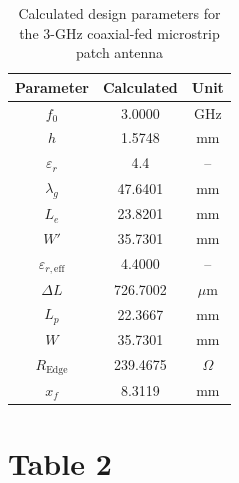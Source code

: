 \documentclass[compress,aspectratio=169,10pt]{beamer}
\begin{document}
\begin{frame}
    \begin{table}[!ht]
        \centering
        \footnotesize
        \begin{tabular}{|c|c|c|}
            \hline
            \textbf{Parameter} & \textbf{Calculated} & \textbf{Unit} \\
            \hline
            $f_0$ & 3.0000 & GHz \\
            \hline
            $h$ & 1.5748 & mm \\
            \hline
            $\varepsilon_r$ & 4.4 & -- \\
            \hline
            $\lambda_g$ & 47.6401 & mm \\
            \hline
            $L_e$ & 23.8201 & mm \\
            \hline
            $W'$ & 35.7301 & mm \\
            \hline
            $\varepsilon_{r,\text{eff}}$ & 4.4000 & -- \\
            \hline
            $\Delta L$ & 726.7002 & $\mu$m \\
            \hline
            $L_p$ & 22.3667 & mm \\
            \hline
            $W$ & 35.7301 & mm \\
            \hline
            $R_{\text{Edge}}$ & 239.4675 & $\Omega$ \\
            \hline
            $x_f$ & 8.3119 & mm \\
            \hline
        \end{tabular}
        \caption{Calculated design parameters for the 3-GHz coaxial-fed microstrip patch antenna}
        \label{tab:table-1-calculated-params}
    \end{table}
\end{frame}
\section[Table 2]{Table 2}
\end{document}
